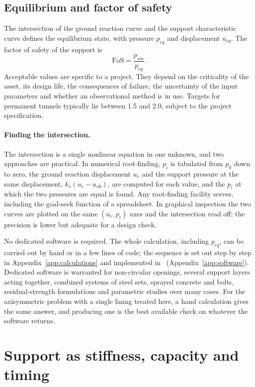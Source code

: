 \subsection{Equilibrium and factor of safety}
\label{sec:ccm-equilibrium}

The intersection of the ground reaction curve and the support characteristic
curve defines the equilibrium state, with pressure $p_{eq}$ and displacement
$u_{eq}$. The factor of safety of the support is
\[
\mathrm{FoS} = \frac{p_{sm}}{p_{eq}}.
\]
Acceptable values are specific to a project. They depend on the criticality
of the asset, its design life, the consequences of failure, the uncertainty
of the input parameters and whether an observational method is in use.
Targets for permanent tunnels typically lie between 1.5 and 2.0, subject to
the project specification.

\paragraph{Finding the intersection.}
The intersection is a single nonlinear equation in one unknown, and two
approaches are practical. In numerical root-finding, $p_i$ is tabulated from
$p_0$ down to zero, the ground reaction displacement $u_r$ and the support
pressure at the same displacement, $k_s(u_r - u_{s0})$, are computed for
each value, and the $p_i$ at which the two pressures are equal is found. Any
root-finding facility serves, including the goal-seek function of a
spreadsheet. In graphical inspection the two curves are plotted on the same
$(u_r, p_i)$ axes and the intersection read off; the precision is lower but
adequate for a design check.

No dedicated software is required. The whole calculation, including
$p_{eq}$, can be carried out by hand or in a few lines of code; the sequence
is set out step by step in Appendix~\ref{app:calculations} and implemented
in \companionname\ (Appendix~\ref{app:software}). Dedicated software is
warranted for non-circular openings, several support layers acting together,
combined systems of steel sets, sprayed concrete and bolts, residual-strength
formulations and parametric studies over many cases. For the axisymmetric
problem with a single lining treated here, a hand calculation gives the same
answer, and producing one is the best available check on whatever the
software returns.

\section{Support as stiffness, capacity and timing}
\label{sec:support-as-stiffness-capacity-and-timing}

